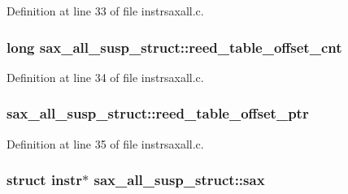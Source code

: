 Definition at line 33 of file instrsaxall.\+c.

\subsubsection[{\texorpdfstring{reed\+\_\+table\+\_\+offset\+\_\+cnt}{reed_table_offset_cnt}}]{\setlength{\rightskip}{0pt plus 5cm}long sax\+\_\+all\+\_\+susp\+\_\+struct\+::reed\+\_\+table\+\_\+offset\+\_\+cnt}\hypertarget{structsax__all__susp__struct_a3c95a7afdd0c5d9294baf3b341a5a1e8}{}\label{structsax__all__susp__struct_a3c95a7afdd0c5d9294baf3b341a5a1e8}


Definition at line 34 of file instrsaxall.\+c.

\subsubsection[{\texorpdfstring{reed\+\_\+table\+\_\+offset\+\_\+ptr}{reed_table_offset_ptr}}]{ sax\+\_\+all\+\_\+susp\+\_\+struct\+::reed\+\_\+table\+\_\+offset\+\_\+ptr}\hypertarget{structsax__all__susp__struct_a9b4dcf94814cb0b3aa44cde630ccbd4e}{}\label{structsax__all__susp__struct_a9b4dcf94814cb0b3aa44cde630ccbd4e}


Definition at line 35 of file instrsaxall.\+c.

\subsubsection[{\texorpdfstring{sax}{sax}}]{\setlength{\rightskip}{0pt plus 5cm}struct {\bf instr}$\ast$ sax\+\_\+all\+\_\+susp\+\_\+struct\+::sax}\hypertarget{structsax__all__susp__struct_a31975f00ae677e624ebd3570bf31c1f4}{}\label{structsax__all__susp__struct_a31975f00ae677e624ebd3570bf31c1f4}


